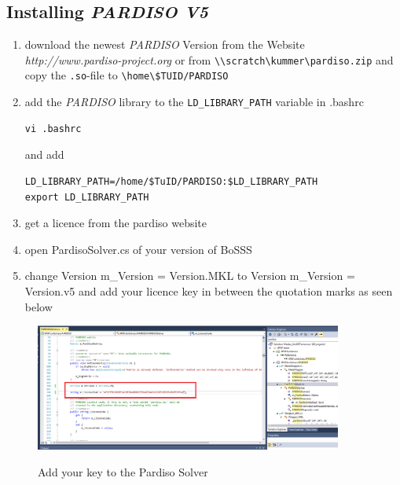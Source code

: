 \documentclass[11pt,twoside,a4paper]{fdyartcl}
\begin{document}
\subsection{Installing \emph{PARDISO V5}}
\begin{enumerate}
\item download the newest \emph{PARDISO} Version from the Website \emph{http://www.pardiso-project.org} or from \verb|\\scratch\kummer\pardiso.zip| and copy the \verb|.so|-file to \verb|\home\$TUID/PARDISO|
\item  add the \emph{PARDISO} library to the \verb|LD_LIBRARY_PATH| variable in .bashrc
\begin{verbatim}
vi .bashrc
\end{verbatim}
and add
\begin{verbatim}
LD_LIBRARY_PATH=/home/$TuID/PARDISO:$LD_LIBRARY_PATH
export LD_LIBRARY_PATH
\end{verbatim}
\item get a licence from the pardiso website
\item open PardisoSolver.cs of your version of BoSSS
\item change Version m\_Version = Version.MKL to Version m\_Version = Version.v5 and add your licence key in between the quotation marks as seen below
\end{enumerate}
\begin{figure}[htbp] %
	\begin{centering}
		\includegraphics[width=0.9\textwidth]{Figures/pardiso_licence.png}\\
	\end{centering}
	\caption{Add your key to the Pardiso Solver}\label{fig:pardiso_licence}
\end{figure} %
\end{document}
